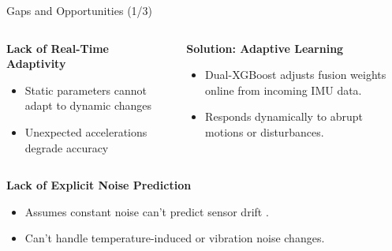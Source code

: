\documentclass[aspectratio=169,xcolor=dvipsnames]{beamer}
\begin{document}
\begin{frame}{Gaps and Opportunities (1/3)}
\scriptsize
\begin{columns}[T]
    \begin{column}{0.48\textwidth}
    \begin{block}{{\textbf{Lack of Real-Time Adaptivity}}}
    \begin{itemize}
        \item Static parameters cannot adapt to dynamic changes \cite{madgwick2011estimation}\cite{compfilter}\cite{rosario2016smartphonequat}
        \item Unexpected accelerations degrade accuracy \cite{vandijk2021mlreview}
    \end{itemize}
    \end{block}
    \end{column}
    
    \begin{column}{0.48\textwidth}
    \begin{exampleblock}{{\textbf{Solution: Adaptive Learning}}}
    \begin{itemize}
        \item Dual-XGBoost adjusts fusion weights online from incoming IMU data.
        \item Responds dynamically to abrupt motions or disturbances.
    \end{itemize}
    \end{exampleblock}
    \end{column}
\end{columns}

\vspace{0.8em}

\begin{columns}[T]
    \begin{column}{0.48\textwidth}
    \begin{block}{{\textbf{Lack of Explicit Noise Prediction}}}
    \begin{itemize}
        \item Assumes constant noise \cite{EKF}\cite{quatEKF}\cite{doubleEKF} can't predict sensor drift \cite{damagatla2024xgboostnoiseekf}.
        \item Can't handle temperature-induced or vibration noise changes\cite{damagatla2024xgboostnoiseekf}.
    \end{itemize}
    \end{block}
    \end{column}
    

\end{columns}
\end{frame}
\end{document}
